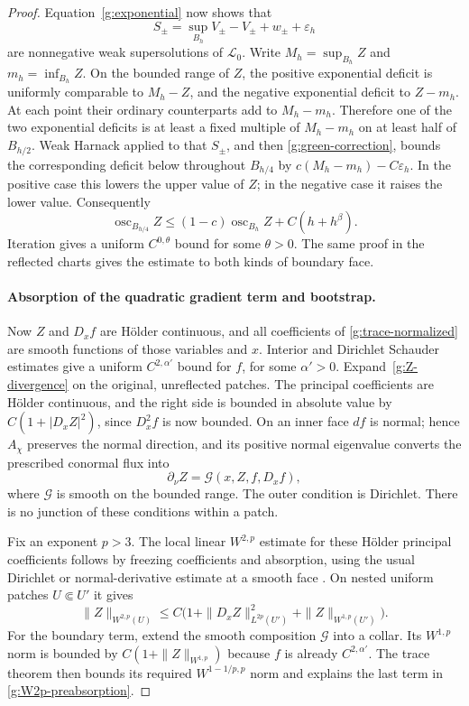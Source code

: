 \begin{proof}
Equation~\eqref{g:exponential} now shows that
\[
 S_\pm=\sup_{B_h}V_\pm-V_\pm+w_\pm+\varepsilon_h
\]
are nonnegative weak supersolutions of $\mathcal L_0$.  Write
$M_h=\sup_{B_h}Z$ and $m_h=\inf_{B_h}Z$.  On the bounded range of
$Z$, the positive exponential deficit is uniformly comparable to
$M_h-Z$, and the negative exponential deficit to $Z-m_h$.
At each point their ordinary counterparts add to $M_h-m_h$.
Therefore one of the two exponential deficits is at least a fixed
multiple of $M_h-m_h$ on at least half of $B_{h/2}$.
Weak Harnack applied to that $S_\pm$, and then
\eqref{g:green-correction}, bounds the corresponding deficit below
throughout $B_{h/4}$ by
$c(M_h-m_h)-C\varepsilon_h$.  In the positive case this lowers the
upper value of $Z$; in the negative case it raises the lower value.
Consequently
\begin{equation}\label{g:oscillation-decay}
 \operatorname{osc}_{B_{h/4}}Z
       \leq(1-c)\operatorname{osc}_{B_h}Z+C(h+h^\beta).
\end{equation}
Iteration gives a uniform $C^{0,\theta}$ bound for some $\theta>0$.
The same proof in the reflected charts gives the estimate to both kinds
of boundary face.

\paragraph{Absorption of the quadratic gradient term and bootstrap.}
Now $Z$ and $D_xf$ are H\"older continuous, and all coefficients of
\eqref{g:trace-normalized} are smooth functions of those variables and
$x$.  Interior and Dirichlet Schauder estimates give a uniform
$C^{2,\alpha'}$ bound for $f$, for some $\alpha'>0$.
Expand~\eqref{g:Z-divergence} on the original, unreflected patches.
The principal coefficients are H\"older continuous, and the right side
is bounded in absolute value by $C(1+|D_xZ|^2)$, since $D_x^2f$ is
now bounded.  On an inner face $df$ is normal; hence $A_\chi$ preserves
the normal direction, and its positive normal eigenvalue converts the
prescribed conormal flux into
\[
 \partial_\nu Z=\mathcal G(x,Z,f,D_xf),
\]
where $\mathcal G$ is smooth on the bounded range.  The outer condition
is Dirichlet.  There is no junction of these conditions within a patch.

Fix an exponent $p>3$.  The local linear $W^{2,p}$ estimate for these
H\"older principal coefficients follows by freezing coefficients and
absorption, using the usual Dirichlet or normal-derivative estimate at
a smooth face \cite{AgmonDouglisNirenberg1959,GilbargTrudinger2001}.
On nested uniform patches $U\Subset U'$ it gives
\begin{equation}\label{g:W2p-preabsorption}
 \|Z\|_{W^{2,p}(U)}
       \leq C\bigl(1+\|D_xZ\|_{L^{2p}(U')}^2
                         +\|Z\|_{W^{1,p}(U')}\bigr).
\end{equation}
For the boundary term, extend the smooth composition $\mathcal G$
into a collar.  Its $W^{1,p}$ norm is bounded by
$C(1+\|Z\|_{W^{1,p}})$ because $f$ is already $C^{2,\alpha'}$.
The trace theorem then bounds its required
$W^{1-1/p,p}$ norm and explains the last term in
\eqref{g:W2p-preabsorption}.


\end{proof}
